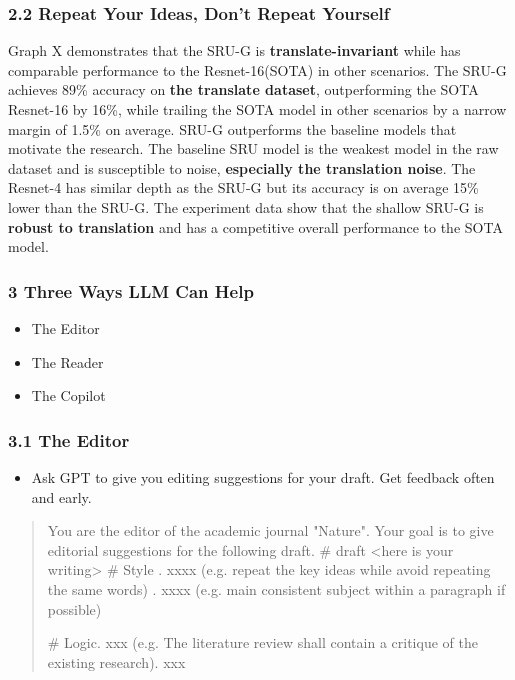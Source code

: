 \documentclass{beamer}
\begin{document}
\begin{frame}
\frametitle{2.2 Repeat Your Ideas, Don't Repeat Yourself}
Graph X demonstrates that the SRU-G is \textbf{translate-invariant} while has comparable performance to the Resnet-16(SOTA) in other scenarios.
The SRU-G achieves 89\% accuracy on \textbf{the translate dataset}, outperforming the SOTA Resnet-16 by 16\%, while trailing the SOTA model in other scenarios by a narrow margin of 1.5\% on average.
SRU-G outperforms the baseline models that motivate the research. The baseline SRU model is the weakest model in the raw dataset and is susceptible to noise, \textbf{especially the translation noise}. The Resnet-4 has similar depth as the SRU-G but its accuracy is on average 15\% lower than the SRU-G.
The experiment data show that the shallow SRU-G is \textbf{robust to translation} and has a competitive overall performance to the SOTA model.
\end{frame}


  \begin{frame}
    \frametitle{3 Three Ways LLM Can Help}
    \begin{itemize}
        \item The Editor
        \item The Reader
        \item The Copilot
    \end{itemize}
\end{frame}

\begin{frame}
\frametitle{3.1 The Editor}
\begin{itemize}
    \item Ask GPT to give you editing suggestions for your draft. Get feedback often and early.
\end{itemize}
\begin{quote}
    You are the editor of the academic journal "Nature". Your goal is to give editorial suggestions for the following draft.
    \newline
    \# draft \newline
    <here is your writing>
    \newline
    \# Style . xxxx (e.g. repeat the key ideas while avoid repeating the same words) . xxxx (e.g. main consistent subject within a paragraph if possible) \newline

    \# Logic. xxx (e.g. The literature review shall contain a critique of the existing research). xxx\newline
\end{quote}

\end{frame}   
\end{document}
